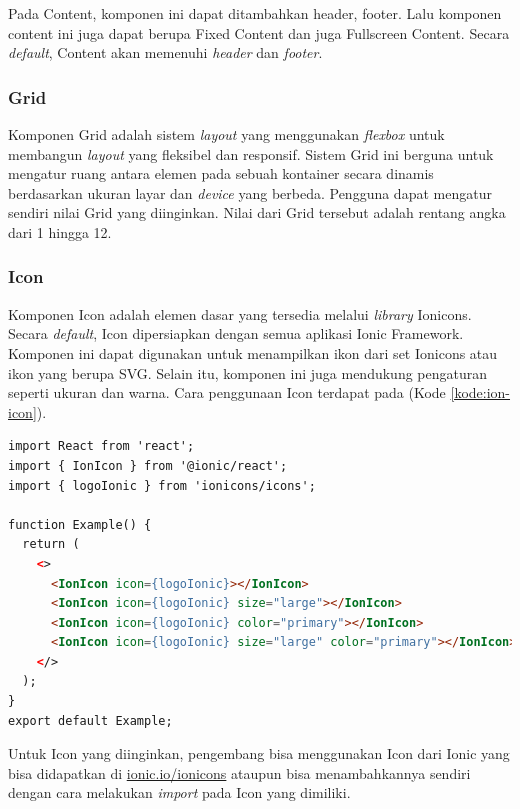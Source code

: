Pada Content, komponen ini dapat ditambahkan header, footer. Lalu komponen content ini juga dapat berupa Fixed Content dan juga Fullscreen Content. Secara \textit{default}, Content akan memenuhi \textit{header} dan \textit{footer}.

\subsubsection{Grid}
\label{subsubsec:grid}
Komponen Grid adalah sistem \textit{layout} yang menggunakan \textit{flexbox} untuk membangun \textit{layout} yang fleksibel dan responsif. Sistem Grid ini berguna untuk mengatur ruang antara elemen pada sebuah kontainer secara dinamis berdasarkan ukuran layar dan \textit{device} yang berbeda. Pengguna dapat mengatur sendiri nilai Grid yang diinginkan. Nilai dari Grid tersebut adalah rentang angka dari 1 hingga 12. 

\subsubsection{Icon}
\label{subsubsec:icon}
Komponen Icon adalah elemen dasar yang tersedia melalui \textit{library} Ionicons. Secara \textit{default}, Icon dipersiapkan dengan semua aplikasi Ionic Framework. Komponen ini dapat digunakan untuk menampilkan ikon dari set Ionicons atau ikon yang berupa SVG. Selain itu, komponen ini juga mendukung pengaturan seperti ukuran dan warna. Cara penggunaan Icon terdapat pada (Kode \ref{kode:ion-icon}).

\begin{lstlisting}[language=HTML, caption=Contoh Kode Penggunaan Icon, label=kode:ion-icon]
import React from 'react';
import { IonIcon } from '@ionic/react';
import { logoIonic } from 'ionicons/icons';

function Example() {
  return (
    <>
      <IonIcon icon={logoIonic}></IonIcon>
      <IonIcon icon={logoIonic} size="large"></IonIcon>
      <IonIcon icon={logoIonic} color="primary"></IonIcon>
      <IonIcon icon={logoIonic} size="large" color="primary"></IonIcon>
    </>
  );
}
export default Example;
\end{lstlisting}

Untuk Icon yang diinginkan, pengembang bisa menggunakan Icon dari Ionic yang bisa didapatkan di \url{ionic.io/ionicons} ataupun bisa menambahkannya sendiri dengan cara melakukan \textit{import} pada Icon yang dimiliki.



